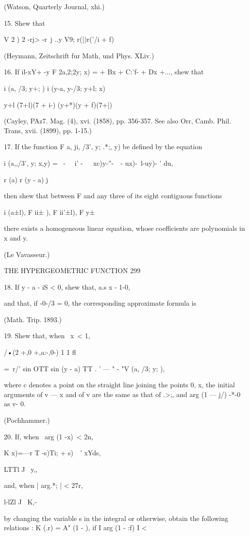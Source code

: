 (Watson, Quarterly Journal, xhi.)

15. Shew that

V 2 ) 2 -rj> -r\ j ..y V9; r(|)r('/i + f)

(Heymann, Zeitschrift fur Math, und Phys. XLiv.)

16. If il-xY+ -y F 2a,2;2y; x) = + Bx + C:'f- + Dx +..., shew that

i (a, /3; y+; ) i (y-a, y-/3; y+l; x)

y+l (7+l)(7 + i-) (y+*)(y + f)(7+|)

(Cayley, PAz7. Mag. (4), xvi. (1858), pp. 356-357. See also Orr, Camb.
Phil. Trans, xvii. (1899), pp. 1-15.)

17. If the function F a, ji, /3', y; .*;, y) be defined by the
equation

i (a,,/3', y; x,y) = \ - \ \ i' -\ \ ~xc)y-''-\ \ - ux)-\ l-uy)- '
du,

r (a) r (y - a) j

then shew that between F and any three of its eight contiguous
functions

i (a±l), F ii± ), F ii'±l), F y±\ \

there exists a homogeneous linear equation, whose coefficients are
polynomials in x and y.

(Le Vavasseur.)

THE HYPERGEOMETRIC FUNCTION 299

18. If y - a - iS < 0, shew that, a.s x - 1-0,

and that, if -0-/3 = 0, the corresponding approximate formula is

(Math. Trip. 1893.)

19. Shew that, when \ x\ < 1,

/•(2 +,0 +,a:-,0-) 1 1 fl

= \,r/' sin OTT sin (y - a) TT . ' — " - "V (a, /3; y; ),

where c denotes a point on the straight line joining the points 0, x,
the initial arguments of v — x and of v are the same as that of .>;,
and arg (1 — j/) -*-0 as v- 0.

(Pochhammer.)

20. If, when \ arg (1 -x)\ < 2n,

K x)=—r T -s)Ti; + s)\ \ ' xYds,

LTTl J \ y,,

and, when | arg.*; | < 27r,

l-lZl J \ K,-

by changing the variable s in the integral or otherwise, obtain the
following relations : K (.r) = A" (1 - ), if I arg (1 - :f) I <

